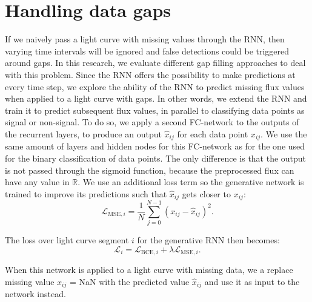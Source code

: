 
\section{Handling data gaps}
\label{sec:rnn_gen}

If we naively pass a light curve with missing values through the RNN, then varying time intervals will be ignored and false detections could be triggered around gaps. In this research, we evaluate different gap filling approaches to deal with this problem. Since the RNN offers the possibility to make predictions at every time step, we explore the ability of the RNN to predict missing flux values when applied to a light curve with gaps. In other words, we extend the RNN and train it to predict subsequent flux values, in parallel to classifying data points as signal or non-signal. To do so, we apply a second FC-network to the outputs of the recurrent layers, to produce an output $\hat{x}_{ij}$ for each data point $x_{ij}$. We use the same amount of layers and hidden nodes for this FC-network as for the one used for the binary classification of data points. The only difference is that the output is not passed through the sigmoid function, because the preprocessed flux can have any value in $\mathbb{R}$. We use an additional loss term so the generative network is trained to improve its predictions such that $\hat{x}_{ij}$ gets closer to $x_{ij}$:
\begin{equation}
    \mathcal{L}_{\text{MSE},i} = \frac{1}{N}\sum^{N-1}_{j=0} (x_{ij} - \hat{x}_{ij})^2.
\end{equation}

\noindent The loss over light curve segment $i$ for the generative RNN then becomes:
\begin{equation}
    \mathcal{L}_i = \mathcal{L}_{\text{BCE},i} + \lambda \mathcal{L}_{\text{MSE},i}.
\end{equation}

\noindent When this network is applied to a light curve with missing data, we a replace missing value $x_{ij}$ = NaN with the predicted value $\hat{x}_{ij}$ and use it as input to the network instead.